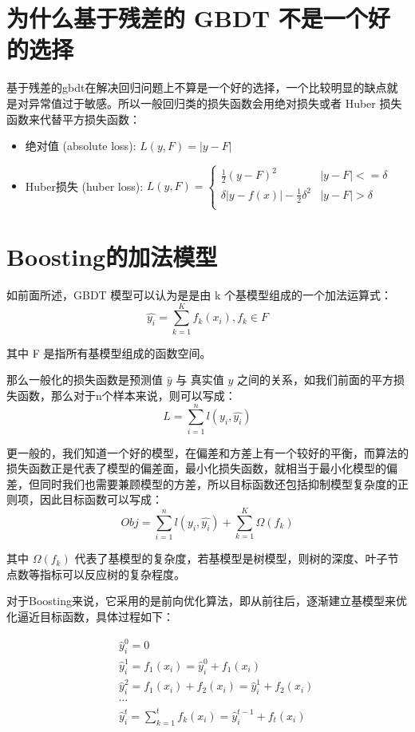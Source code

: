\documentclass[12pt]{article}
\begin{document}
\section{为什么基于残差的 GBDT 不是一个好的选择}

基于残差的gbdt在解决回归问题上不算是一个好的选择，一个比较明显的缺点就是对异常值过于敏感。所以一般回归类的损失函数会用绝对损失或者 Huber 损失函数来代替平方损失函数：

\begin{itemize}[itemindent=2em]
    \item 绝对值 (absolute loss): 
    $L(y,F) = |y-F|$
    
    \item Huber损失 (huber loss): 
    $L(y,F) = \begin{cases}
\frac{1}{2}(y-F)^2 & |y-F| <= \delta\\
\delta|y-f(x)|-\frac{1}{2}\delta^2 & |y-F| > \delta\\
\end{cases}$
\end{itemize}

\section{Boosting的加法模型}
如前面所述，GBDT 模型可以认为是是由 k 个基模型组成的一个加法运算式：
$$
\hat{y_i} = \sum_{k=1}^K{f_k(x_i)}, f_k \in F
$$

其中 F 是指所有基模型组成的函数空间。

那么一般化的损失函数是预测值 $\hat{y}$ 与 真实值 $y$ 之间的关系，如我们前面的平方损失函数，那么对于n个样本来说，则可以写成：
$$
L = \sum_{i=1}^n{l(y_i,\hat{y_i})}
$$

更一般的，我们知道一个好的模型，在偏差和方差上有一个较好的平衡，而算法的损失函数正是代表了模型的偏差面，最小化损失函数，就相当于最小化模型的偏差，但同时我们也需要兼顾模型的方差，所以目标函数还包括抑制模型复杂度的正则项，因此目标函数可以写成：
$$
Obj = \sum_{i=1}^n{l(y_i,\hat{y_i})} + \sum_{k=1}^{K}\Omega(f_k)
$$

其中 $\Omega(f_k)$ 代表了基模型的复杂度，若基模型是树模型，则树的深度、叶子节点数等指标可以反应树的复杂程度。

对于Boosting来说，它采用的是前向优化算法，即从前往后，逐渐建立基模型来优化逼近目标函数，具体过程如下：

\begin{eqnarray*}
 && \hat{y}_i^0 = 0 \\
 && \hat{y}_i^1 = f_1(x_i)= \hat{y}_i^0 + f_1(x_i)\\
 && \hat{y}_i^2 = f_1(x_i) + f_2(x_i) = \hat{y}_i^1 + f_2(x_i) \\
 && \cdots \\
 && \hat{y}_i^t = \sum_{k=1}^tf_k(x_i) = \hat{y}_i^{t-1} + f_t(x_i)
\end{eqnarray*}
\end{document}
